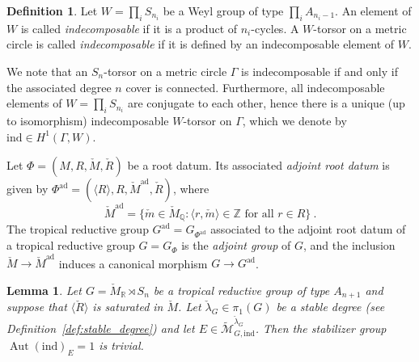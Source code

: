 \documentclass[10pt, a4paper]{amsart}
\newtheorem{lemma}[theorem]{Lemma}
\theoremstyle{definition}
\newtheorem{definition}[theorem]{Definition}
\theoremstyle{myitemstyle}
\newcommand{\R}{\mathbb{R}}
\newcommand{\Z}{\mathbb{Z}}
\newcommand{\Q}{\mathbb{Q}}
\newcommand{\Mcheck}{{\check{M}}}
\newcommand{\lambdacheck}{\check{\lambda}}
\newcommand{\Rcheck}{\check{R}}
\newcommand{\wmc}[1]{{\widetilde{\mathcal{#1}}}}
\DeclareMathOperator{\Aut}{Aut}
\newcommand{\ind}{\mathrm{ind}}
\newcommand{\ad}{{\mathrm{ad}}}
\newcommand{\Ga}{\Gamma}
\begin{document}
\begin{definition} Let $W=\prod_i S_{n_i}$ be a Weyl group of type $\prod_{i}A_{n_i-1}$. An element of $W$ is called \emph{indecomposable} if it is a product of $n_i$-cycles. A $W$-torsor on a metric circle is called \emph{indecomposable} if it is defined by an indecomposable element of $W$.
\end{definition}

We note that an $S_n$-torsor on a metric circle $\Ga$ is indecomposable if and only if the associated degree $n$ cover is connected. Furthermore, all indecomposable elements of $W=\prod_i S_{n_i}$ are conjugate to each other, hence there is a unique (up to isomorphism) indecomposable $W$-torsor on $\Gamma$, which we denote by $\ind\in H^1(\Ga,W)$. 




Let $\Phi=(M,R,\Mcheck,\Rcheck)$ be a root datum. Its associated \emph{adjoint root datum} is given by $\Phi^\ad= (\langle R\rangle,R, \Mcheck^\ad, \Rcheck)$, where 
\[
\Mcheck^\ad=\{\check m \in \Mcheck_\Q : \langle r, \check m\rangle\in \Z \text{ for all }r\in R \} \ .
\]
The tropical reductive group $G^\ad=G_{\Phi^\ad}$ associated to the adjoint root datum of a tropical reductive group $G=G_\Phi$ is the \emph{adjoint group} of $G$, and the inclusion $\Mcheck \to \Mcheck^\ad$ induces a canonical morphism $G\to G^\ad$.


\begin{lemma}
\label{lem:stabilizers in Aut(tau) in An case}
Let $G=\Mcheck_\R\rtimes S_n$ be a tropical reductive group of type $A_{n+1}$ and suppose that $\langle \Rcheck\rangle$ is saturated in $\Mcheck$. Let $\lambdacheck_G\in \pi_1(G)$ be a stable degree (see Definition~\ref{def:stable_degree}) and let $E\in \wmc M_{G,\ind}^{\lambdacheck_G}$. Then the stabilizer group $\Aut(\ind)_E=1$ is trivial.
\end{lemma}
\end{document}
